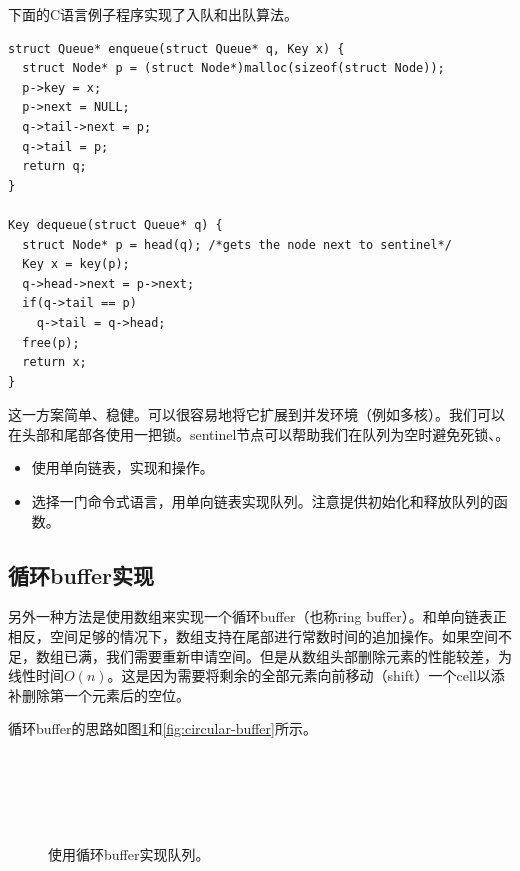 \documentclass[UTF8]{article}
\begin{document}
下面的C语言例子程序实现了入队和出队算法。

\begin{lstlisting}
struct Queue* enqueue(struct Queue* q, Key x) {
  struct Node* p = (struct Node*)malloc(sizeof(struct Node));
  p->key = x;
  p->next = NULL;
  q->tail->next = p;
  q->tail = p;
  return q;
}

Key dequeue(struct Queue* q) {
  struct Node* p = head(q); /*gets the node next to sentinel*/
  Key x = key(p);
  q->head->next = p->next;
  if(q->tail == p)
    q->tail = q->head;
  free(p);
  return x;
}
\end{lstlisting}

这一方案简单、稳健。可以很容易地将它扩展到并发环境（例如多核）。我们可以在头部和尾部各使用一把锁。sentinel节点可以帮助我们在队列为空时避免死锁\cite{PODC96}、\cite{SutterDDJ}。

\begin{Exercise}
\begin{itemize}
\item 使用单向链表，实现和操作。

\item 选择一门命令式语言，用单向链表实现队列。注意提供初始化和释放队列的函数。
\end{itemize}
\end{Exercise}

\subsection{循环buffer实现}

另外一种方法是使用数组来实现一个循环buffer（也称ring buffer）。和单向链表正相反，空间足够的情况下，数组支持在尾部进行常数时间的追加操作。如果空间不足，数组已满，我们需要重新申请空间。但是从数组头部删除元素的性能较差，为线性时间$O(n)$。这是因为需要将剩余的全部元素向前移动（shift）一个cell以添补删除第一个元素后的空位。

循环buffer的思路如图\ref{fig:circular-buffer-queue}和\ref{fig:circular-buffer}所示。

\begin{figure}[htbp]
 \centering
  \\
  \\
  \\
  \\
 \caption{使用循环buffer实现队列。} \label{fig:circular-buffer-queue}
\end{figure}
\end{document}

